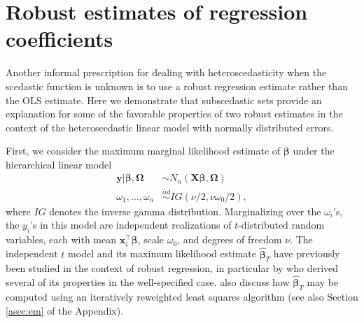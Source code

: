 \documentclass[12pt]{article}
\newcommand{\bl}[1]{{\mathbf #1}}
\newcommand{\bs}[1]{\boldsymbol #1}
\begin{document}
\section{Robust estimates of regression coefficients}\label{sec:robust}

Another informal prescription for dealing with heteroscedasticity when the scedastic function is unknown is to use a robust regression estimate rather than the OLS estimate. Here we demonstrate that subscedastic sets provide an explanation for some of the favorable properties of two robust estimates in the context of the heteroscedastic linear model with normally distributed errors.

First, we consider the maximum marginal likelihood estimate of $\bs{\beta}$ under the hierarchical linear model
\begin{equation}\label{eq:tmod}
    \begin{aligned}
    \bl{y} | \bs{\beta}, \bs{\Omega} &\sim N_n(\bl{X} \bs{\beta}, \bs{\Omega}) \\
    \omega_1, \dots, \omega_n &\overset{iid}{\sim} IG(\nu/2, \nu \omega_0 / 2),
    \end{aligned} 
\end{equation}
where $IG$ denotes the inverse gamma distribution. Marginalizing over the $\omega_i$'s, the $y_i$'s in this model are independent realizations of $t$-distributed random variables, each with mean $\bl{x}_i^\top \bs{\beta}$, scale $\omega_0$, and degrees of freedom $\nu$. The independent $t$ model and its maximum likelihood estimate $\hat{\bs{\beta}}_T$ have previously been studied in the context of robust regression, in particular by \cite{lange_robust_1989} who derived several of its properties in the well-specified case. \cite{lange_normalindependent_1993} also discuss how $\hat{\bs{\beta}}_T$ may be computed using an iteratively reweighted least squares algorithm (see also Section \ref{asec:em} of the Appendix). 
\end{document}
